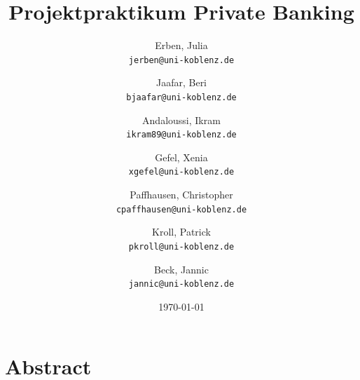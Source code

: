 \documentclass{article}\usepackage[]{graphicx}\usepackage[]{color}
\begin{document}

\parindent 0pt %
\renewcommand\refname{Literaturverzeichnis} %
\renewcommand\contentsname{Inhaltsverzeichnis} %
\renewcommand{\figurename}{Abbildung} %

\title{\Large \bf Projektpraktikum Private Banking} %

\date{\today} %

\author{ %
  Erben, Julia\\
  \texttt{jerben@uni-koblenz.de}
  \and
  Jaafar, Beri\\
  \texttt{bjaafar@uni-koblenz.de}
  \and
  Andaloussi, Ikram\\
  \texttt{ikram89@uni-koblenz.de}
  \and
  Gefel, Xenia\\
  \texttt{xgefel@uni-koblenz.de}
  \and
  Paffhausen, Christopher\\
  \texttt{cpaffhausen@uni-koblenz.de}
  \and
  Kroll, Patrick\\
  \texttt{pkroll@uni-koblenz.de}
  \and
  Beck, Jannic\\
  \texttt{jannic@uni-koblenz.de}
}

\maketitle %

\thispagestyle{empty} %

\newpage %

\thispagestyle{empty} %

\tableofcontents %

\newpage %



\section*{Abstract} %
\end{document}
